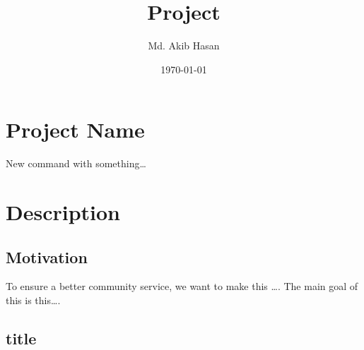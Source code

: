 \documentclass[a4paper,11pt]{report}
\begin{document}
\begin{titlepage}
	\title{Project}
	\author{Md. Akib Hasan}
	\date{\today}
	\maketitle
\end{titlepage}
\section*{Project Name}
New command with something\dots

\section*{Description}
\subsection*{Motivation}
To ensure a better community service, we want to make this \dots . The main goal of this is this\dots.
\subsection*{title}
\end{document}
